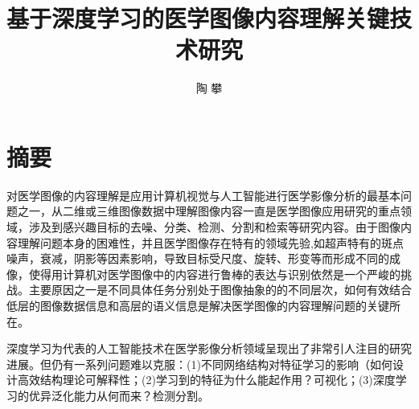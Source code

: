   \confidential{}%
  \title[中国科学院大学博士论文]{基于深度学习的医学图像内容理解关键技术研究}%
  \author{陶 攀}%
\maketitle
\makeenglishtitle
\makedeclaration
\chapter*{摘\quad 要}%
\setcounter{page}{1}%

对医学图像的内容理解是应用计算机视觉与人工智能进行医学影像分析的最基本问题之一，从二维或三维图像数据中理解图像内容一直是医学图像应用研究的重点领域，涉及到感兴趣目标的去噪、分类、检测、分割和检索等研究内容。由于图像内容理解问题本身的困难性，并且医学图像存在特有的领域先验,如超声特有的斑点噪声，衰减，阴影等因素影响，导致目标受尺度、旋转、形变等而形成不同的成像，使得用计算机对医学图像中的内容进行鲁棒的表达与识别依然是一个严峻的挑战。主要原因之一是不同具体任务分别处于图像抽象的的不同层次，如何有效结合低层的图像数据信息和高层的语义信息是解决医学图像的内容理解问题的关键所在。

深度学习为代表的人工智能技术在医学影像分析领域呈现出了非常引人注目的研究进展。但仍有一系列问题难以克服：(1)不同网络结构对特征学习的影响（如何设计高效结构理论可解释性；(2)学习到的特征为什么能起作用？可视化；(3)深度学习的优异泛化能力从何而来？检测分割。

